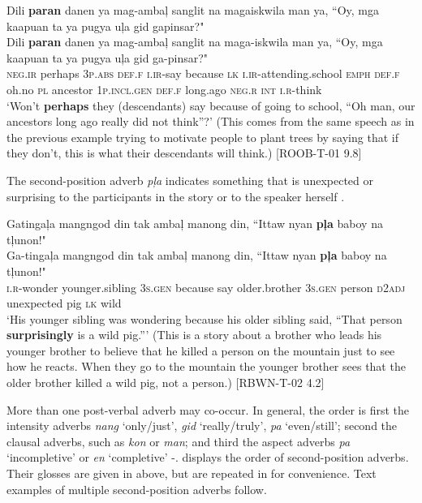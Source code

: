 \ea
\label{bkm:Ref441522272}
Dili  \textbf{paran}  danen  ya  mag-ambaļ  sanglit  na  magaiskwila  man ya, “Oy,  mga  kaapuan  ta  ya  pugya  uļa  gid  gapinsar?" \\\smallskip
 \gll Dili  \textbf{paran}  danen  ya  mag-ambaļ  sanglit  na  maga-iskwila  man ya, “Oy,  mga  kaapuan  ta  ya  pugya  uļa  gid  ga-pinsar?" \\
\textsc{neg.ir}  perhaps  3\textsc{p.abs}  \textsc{def.f}  \textsc{i.ir}-say  because  \textsc{lk}  \textsc{i.ir}-attending.school  \textsc{emph}
\textsc{def.f}  oh.no  \textsc{pl}  ancestor  1\textsc{p.incl.gen}  \textsc{def.f}  long.ago  \textsc{neg.r}  \textsc{int}  \textsc{i.r}-think \\
\glt `Won’t \textbf{perhaps} they (descendants) say because of going to school, “Oh man, our ancestors long ago really did not think”?’ (This comes from the same speech as in the previous example trying to motivate people to plant trees by saying that if they don’t, this is what their descendants will think.) [ROOB-T-01 9.8]
\z

The second-position adverb \textit{pļa} indicates something that is unexpected or surprising to the participants in the story or to the speaker herself .

\ea
\label{bkm:Ref441348269}
Gatingaļa  mangngod  din  tak  ambaļ  manong  din,  ``Ittaw nyan  \textbf{pļa}  baboy  na  tļunon!" \\\smallskip
 \gll Ga-tingaļa  mangngod  din  tak  ambaļ  manong  din,  ``Ittaw nyan  \textbf{pļa}  baboy  na  tļunon!" \\
\textsc{i.r}-wonder  younger.sibling  3\textsc{s.gen}  because  say  older.brother  3\textsc{s.gen}  person
\textsc{d2adj}  unexpected  pig  \textsc{lk}  wild \\
\glt `His younger sibling was wondering because his older sibling said, “That person \textbf{surprisingly} is a wild pig.”{}' (This is a story about a brother who leads his younger brother to believe that he killed a person on the mountain just to see how he reacts. When they go to the mountain the younger brother sees that the older brother killed a wild pig, not a person.) [RBWN-T-02 4.2]
\z

More than one post-verbal adverb may co-occur. In general, the order is first the intensity adverbs \textit{nang} ‘only/just’, \textit{gid} ‘really/truly’, \textit{pa} ‘even/still’; second the clausal adverbs, such as \textit{kon} or \textit{man}; and third the aspect adverbs \textit{pa} ‘incompletive’ or \textit{en} ‘completive’ -.  displays the order of second-position adverbs. Their glosses are given in  above, but are repeated in  for convenience. Text examples of multiple second-position adverbs follow.

